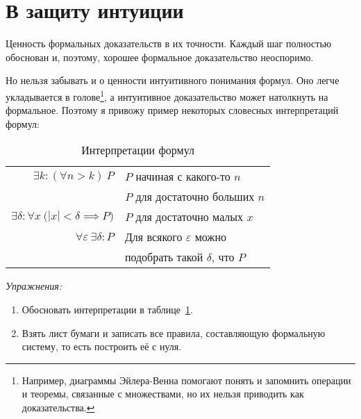 \pagebreak

\part{В защиту интуиции}

Ценность формальных доказательств в их точности. Каждый шаг полностью обоснован и,
поэтому, хорошее формальное доказательство неоспоримо.

Но нельзя забывать и о ценности интуитивного понимания формул.
Оно легче укладывается в голове\footnote{Например, диаграммы
	Эйлера-Венна помогают понять и запомнить операции и теоремы, связанные с
	множествами, но их нельзя приводить как доказательства.},
а интуитивное доказательство может натолкнуть на формальное. Поэтому я привожу пример
некоторых словесных интерпретаций формул:
\begin{table}
	\centering
	\begin{tabular}{r|l}
		$\exists k:(\forall n>k)~P$     & $P$ начиная с какого-то $n$       \\
		                                & $P$ для достаточно больших $n$    \\[1em]
		$\exists \delta:\forall x~
		\big(|x|<\delta\implies P\big)$ & $P$ для достаточно малых $x$      \\[1em]
		$\forall \varepsilon~
		\exists \delta:P$               & Для всякого $\varepsilon$ можно   \\
		                                & подобрать такой $\delta$, что $P$
	\end{tabular}
	\caption{Интерпретации формул}\label{table:formula_interp}
\end{table}

{\it Упражнения:}
\begin{enumerate}
	\item{}Обосновать интерпретации в таблице~\ref{table:formula_interp}.
	\item{}Взять лист бумаги и записать
	все правила, составляющую формальную систему, то есть построить её с нуля.
\end{enumerate}

